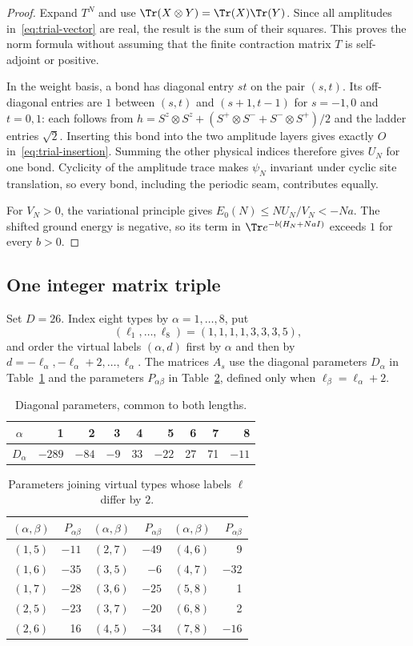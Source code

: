 \begin{proof}
Expand $T^N$ and use $\Tr(X\otimes Y)=\Tr(X)\Tr(Y)$.
Since all amplitudes in~\eqref{eq:trial-vector} are real, the result is
the sum of their squares. This proves the norm formula without assuming
that the finite contraction matrix $T$ is self-adjoint or positive.

In the weight basis, a bond has diagonal entry $st$ on the pair $(s,t)$.
Its off-diagonal entries are $1$ between $(s,t)$ and $(s+1,t-1)$
for $s=-1,0$ and $t=0,1$: each follows from
$h=S^z\otimes S^z+(S^+\otimes S^-+S^-\otimes S^+)/2$
and the ladder entries $\sqrt2$.
Inserting this bond into the two amplitude layers gives exactly
$O$ in~\eqref{eq:trial-insertion}. Summing the other physical indices
therefore gives $U_N$ for one bond.
Cyclicity of the amplitude trace makes $\psi_N$ invariant under cyclic
site translation, so every bond, including the periodic seam, contributes
equally.

For $V_N>0$, the variational principle gives
$E_0(N)\le NU_N/V_N<-Na$. The shifted ground energy is negative, so
its term in $\Tr e^{-b(H_N+NaI)}$ exceeds $1$ for every $b>0$.
\end{proof}

\subsection{One integer matrix triple}

Set $D=26$. Index eight types by $\alpha=1,\ldots,8$,
put
\[
 (\ell_1,\ldots,\ell_8)=(1,1,1,1,3,3,3,5),
\]
and order the virtual labels $(\alpha,d)$ first by $\alpha$ and then by
$d=-\ell_\alpha,-\ell_\alpha+2,\ldots,\ell_\alpha$.
The matrices $A_s$ use the diagonal parameters $D_\alpha$ in
Table~\ref{tab:trial-diagonal} and the parameters
$P_{\alpha\beta}$ in Table~\ref{tab:trial-pairs}, defined only when
$\ell_\beta=\ell_\alpha+2$.

\begin{table}[ht]
\centering
\begin{tabular}{c|rrrrrrrr}
$\alpha$&1&2&3&4&5&6&7&8\\ \hline
$D_\alpha$&$-289$&$-84$&$-9$&33&$-22$&27&71&$-11$
\end{tabular}
\caption{Diagonal parameters, common to both lengths.}
\label{tab:trial-diagonal}
\end{table}

\begin{table}[ht]
\centering
\begin{tabular}{c|r@{\qquad}c|r@{\qquad}c|r}
$(\alpha,\beta)$&$P_{\alpha\beta}$&
$(\alpha,\beta)$&$P_{\alpha\beta}$&
$(\alpha,\beta)$&$P_{\alpha\beta}$\\ \hline
$(1,5)$&$-11$&$(2,7)$&$-49$&$(4,6)$&9\\
$(1,6)$&$-35$&$(3,5)$&$-6$&$(4,7)$&$-32$\\
$(1,7)$&$-28$&$(3,6)$&$-25$&$(5,8)$&1\\
$(2,5)$&$-23$&$(3,7)$&$-20$&$(6,8)$&2\\
$(2,6)$&16&$(4,5)$&$-34$&$(7,8)$&$-16$
\end{tabular}
\caption{Parameters joining virtual types whose labels $\ell$ differ by $2$.}
\label{tab:trial-pairs}
\end{table}

